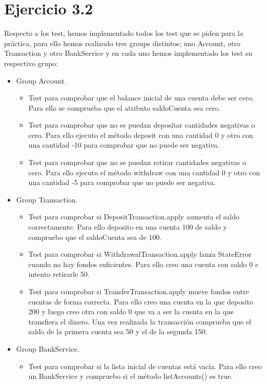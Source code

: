 \documentclass[12pt]{article}
\begin{document}
\section{Ejercicio 3.2}
Respecto a los test, hemos implementado todos los test que se piden para la práctica, para ello hemos realizado tres groups distintos; uno Account, otro Transaction y otro BankService y en cada uno hemos implementado los test su respectivo grupo:
\begin{itemize}
    \item Group Account.
          \begin{itemize}
              \item Test para comprobar que el balance inicial de una cuenta debe ser cero. Para ello se comprueba que el atributo saldoCuenta sea cero.
              \item Test para comprobar que no se puedan depositar cantidades negativas o cero. Para ello ejecuto el método deposit con una cantidad 0 y otro con una cantidad -10 para comprobar que no puede ser negativa.
              \item Test para comprobar que no se puedan retirar cantidades negativas o cero. Para ello ejecuto el método withdraw con una cantidad 0 y otro con una cantidad -5 para comprobar que no puede ser negativa.
          \end{itemize}
    \item Group Transaction.
          \begin{itemize}
              \item Test para comprobar si DepositTransaction.apply aumenta el saldo correctamente. Para ello deposito en una cuenta 100 de saldo y compruebo que el saldoCuenta sea de 100.
              \item Test para comprobar si WithdrawalTransaction.apply lanza StateError cuando no hay fondos suficientes. Para ello creo una cuenta con saldo 0 e intento retirarle 50.
              \item Test para comprobar si TransferTransaction.apply mueve fondos entre cuentas de forma correcta. Para ello creo una cuenta en la que deposito 200 y luego creo otra con saldo 0 que va a ser la cuenta en la que transfiera el dinero. Una vez realizada la transacción comprueba que el saldo de la primera cuenta sea 50 y el de la segunda 150.
          \end{itemize}
    \item Group BankService.
          \begin{itemize}
              \item Test para comprobar si la lista inicial de cuentas está vacía. Para ello creo un BankService y compruebo si el método listAccounts() es true.

\end{itemize}
\end{itemize}
\end{document}
